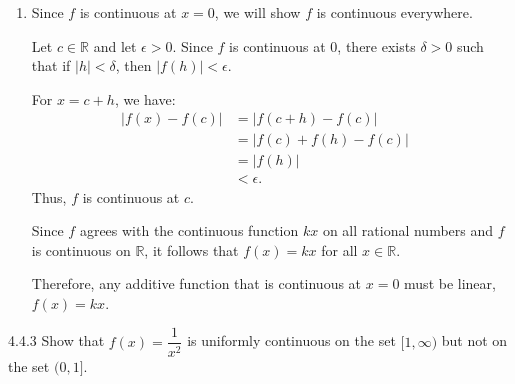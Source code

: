 {\begin{enumerate}
              Now, observe that for \(p,q \in \Z\) with \(q \ne 0\), we have:
              \[
                  f\left(\underbrace{\dfrac{p}{q} + \dfrac{p}{q} + \cdots + \dfrac{p}{q}}_{q\text{ times}}\right) = f(p).
              \]
              Similarly, by the additive condition (\(q\) times on each side):
              \[
                  f\left(\dfrac{p}{q} + \dfrac{p}{q} + \cdots + \dfrac{p}{q}\right) = f\left(\dfrac{p}{q}\right) + f\left(\dfrac{p}{q}\right) + \cdots + f\left(\dfrac{p}{q}\right).
              \]
              This is equivalent to:
              \[
                  q \cdot f\left(\dfrac{p}{q}\right) = f(p).
              \]
              Therefore,
              \[
                  f\left(\dfrac{p}{q}\right) = \dfrac{1}{q} f(p)
              \]
              Putting everything together, we let \(r = \dfrac{p}{q}\). Then,
              \begin{align*}
                  f\left( \dfrac{p}{q} \right) & = \dfrac{1}{q} f(p)                         \\
                                               & = \dfrac{1}{q} (kp) \quad (\text{from (1)}) \\
                                               & = k \left( \dfrac{p}{q} \right)             \\
                                               & = kr.
              \end{align*}
              Thus, \(f(r) = kr\) for any rational number \(r\).
        \item Since \(f\) is continuous at \(x = 0\), we will show \(f\) is continuous everywhere.

              Let \(c \in \mathbb{R}\) and let \(\epsilon > 0\). Since \(f\) is continuous at \(0\), there exists \(\delta > 0\) such that if \(|h| < \delta\), then \(|f(h)| < \epsilon\).

              For \(x = c + h\), we have:
              \begin{align*}
                  |f(x) - f(c)| & = |f(c + h) - f(c)|          \\
                                & = |f(c) + f(h) - f(c)| \quad \\
                                & = |f(h)|                     \\
                                & < \epsilon.
              \end{align*}
              Thus, \(f\) is continuous at \(c\).

              Since \(f\) agrees with the continuous function \(kx\) on all rational numbers and \(f\) is continuous on \(\mathbb{R}\), it follows that \(f(x) = kx\) for all \(x \in \mathbb{R}\).

              Therefore, any additive function that is continuous at \(x = 0\) must be linear, \(f(x) = kx\).
    \end{enumerate}
}
\newpage
\begin{exercise}
    {4.4.3} Show that \(f(x) = \dfrac{1}{x^2}\) is uniformly continuous on the set \([1, \infty)\) but not on the set \((0, 1]\).
\end{exercise}


